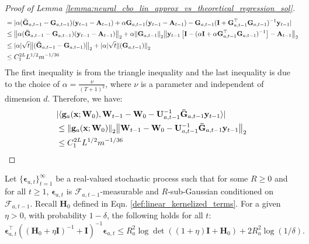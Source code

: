 \begin{proof}[Proof of Lemma \ref{lemma:neural_cbo_lin_approx_vs_theoretical_regression_sol}]
\begin{align*}
    & = \lvert  \alpha (\mathbf{\Bar{G}}_{a, t-1} - \mathbf{G}_{a, t-1}) (\mathbf{y}_{t-1} - \mathbf{A}_{t-1}) + \alpha \mathbf{G}_{a, t-1} (\mathbf{y}_{t-1} - \mathbf{A}_{t-1}) - \mathbf{G}_{a,t-1}(\mathbf{I} + \mathbf{G}_{a,t-1}^\top \mathbf{G}_{a,t-1} )^{-1} \mathbf{y}_{t-1} \rvert
    \\
    & \le \norm{\alpha (\mathbf{\Bar{G}}_{a, t-1} - \mathbf{G}_{a, t-1}) (\mathbf{y}_{t-1} - \mathbf{A}_{t-1})}_2 + \alpha \norm{\mathbf{G}_{a, t-1}}_2 \norm{ \mathbf{y}_{t-1} \left[\mathbf{I} - (\alpha\mathbf{I} + \alpha \mathbf{G}_{a,t-1}^\top \mathbf{G}_{a,t-1} )^{-1} \right] - \mathbf{A}_{t-1}}_2
    \\
    & \le \lvert \alpha \rvert \sqrt{t} \norm{(\mathbf{\Bar{G}}_{a, t-1} - \mathbf{G}_{a, t-1})}_2 + \lvert \alpha \rvert \sqrt{t} \norm{(\mathbf{G}_{a, t-1})}_2
     \\
    & \le C_1^{2L} L^{1/2} m^{-1/36}
\end{align*}
The first inequality is from the triangle inequality and the last inequality is due to the choice of $\alpha = \frac{\nu}{(T+1)^2}$, where $\nu$ is a parameter and independent of
dimension $d$. 
Therefore, we have:
\begin{align*}
    & \lvert \langle \mathbf{g}_a(\mathbf{x};\mathbf{W}_0), \mathbf{W}_{t-1} - \mathbf{W}_0 - \mathbf{U}_{a,t-1}^{-1} \mathbf{\Bar{G}}_{a,t-1} \mathbf{y}_{t-1} \rangle \rvert 
    \\
    & \le \norm{\mathbf{g}_a(\mathbf{x};\mathbf{W}_0)}_2 \norm{\mathbf{W}_{t-1} - \mathbf{W}_0 - \mathbf{U}_{a,t-1}^{-1} \mathbf{\Bar{G}}_{a,t-1} \mathbf{y}_{t-1}}_2 
    \\
    & \le C_1^{2L} L^{1/2} m^{-1/36} 
\end{align*}
\end{proof}








\begin{lemma}
\label{lemma:neural_cbo_noise_affeted_bound}

Let $\{\boldsymbol{\epsilon}_{a, t}\}_{t=1}^\infty$ be a real-valued stochastic process such that for some $R \geq 0$ and for all $t \geq 1$, $\boldsymbol{\epsilon}_{a, t}$ is $\mathcal{F}_{a, t-1}$-measurable and $R$-sub-Gaussian
conditioned on $\mathcal{F}_{a, t-1}$. Recall $\mathbf{H}_{0}$ defined in Eqn.  \ref{def:linear_kernelized_terms}. For a given
$\eta > 0$, with probability $1 - \delta$, the following holds for all $t$:
\[
\boldsymbol{\epsilon}_{a, t}^\top ((\mathbf{H}_0 + \eta\mathbf{I})^{-1}+\mathbf{I})^{-1} \boldsymbol{\epsilon}_{a, t}
\leq R_a^2 \log \det ((1+\eta)\mathbf{I} + \mathbf{H}_0) + 2R_a^2 \log(1/\delta).
\]
\end{lemma}

